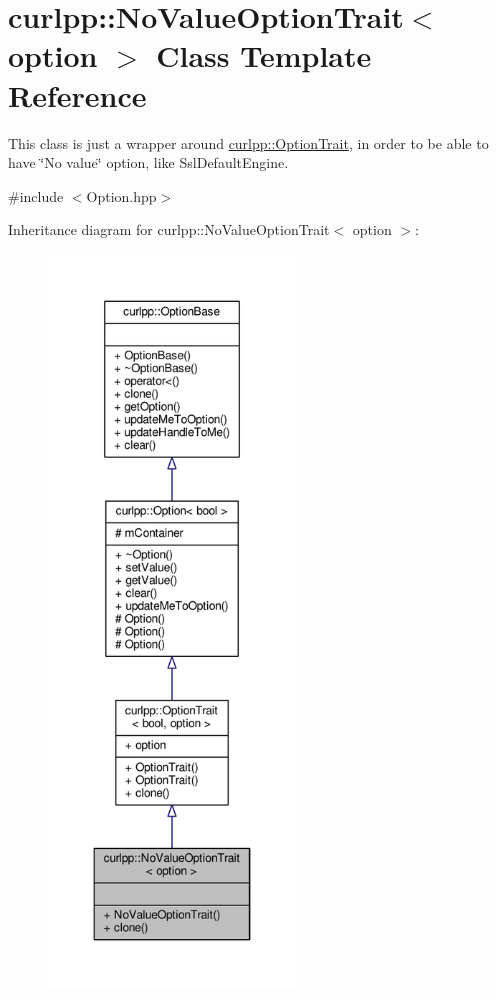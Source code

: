 \hypertarget{classcurlpp_1_1NoValueOptionTrait}{\section{curlpp\-:\-:No\-Value\-Option\-Trait$<$ option $>$ Class Template Reference}
\label{classcurlpp_1_1NoValueOptionTrait}
}


This class is just a wrapper around \hyperlink{classcurlpp_1_1OptionTrait}{curlpp\-::\-Option\-Trait}, in order to be able to have \char`\"{}\-No value\char`\"{} option, like Ssl\-Default\-Engine.  




{\ttfamily \#include $<$Option.\-hpp$>$}



Inheritance diagram for curlpp\-:\-:No\-Value\-Option\-Trait$<$ option $>$\-:\nopagebreak
\begin{figure}[H]
\begin{center}
\leavevmode
\includegraphics[height=550pt]{classcurlpp_1_1NoValueOptionTrait__inherit__graph}
\end{center}
\end{figure}


